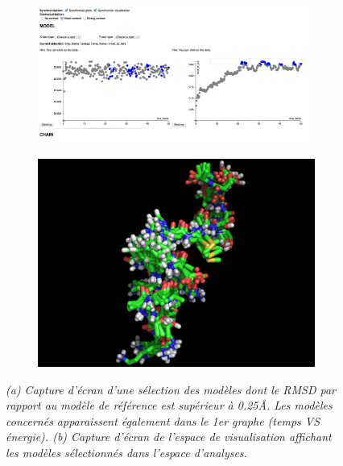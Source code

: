 \begin{figure}[!htb]
\captionsetup[subfigure]{labelformat=empty}
\centering
  \begin{subfigure}{\textwidth}
  \centering
  {\includegraphics[width=0.9\linewidth,frame]{./figures/ch5/4_multi_selection}}
    \caption{}
  \label{Fig:4_multi_selection}
  \end{subfigure}
  \begin{subfigure}{0.5\textwidth}
  \centering
  {\includegraphics[width=\linewidth]{./figures/ch5/4_multi_selection_pymol}}
    \caption{}
  \label{Fig:4_multi_selection_pymol}
  \end{subfigure}
  \caption[Deuxième étape d'utilisation de notre plateforme]{\it (a) Capture d'écran d'une sélection des modèles dont le RMSD par rapport au modèle de référence est supérieur à 0.25\r{A}. Les modèles concernés apparaissent également dans le 1er graphe (temps VS énergie).
  (b) Capture d'écran de l'espace de visualisation affichant les modèles sélectionnés dans l'espace d'analyses.}
\end{figure}

